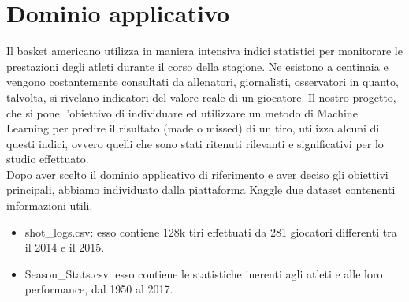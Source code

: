 \section{Dominio applicativo}

Il basket americano utilizza in maniera intensiva indici statistici per monitorare le prestazioni degli atleti durante il corso della stagione. Ne esistono a centinaia e vengono costantemente consultati da allenatori, giornalisti, osservatori in quanto, talvolta, si rivelano indicatori del valore reale di un giocatore.
Il nostro progetto, che si pone l'obiettivo di individuare ed utilizzare un metodo di Machine Learning per predire il risultato (made o missed) di un tiro, utilizza alcuni di questi indici, ovvero quelli che sono stati ritenuti rilevanti e significativi per lo studio effettuato.\\

Dopo aver scelto il dominio applicativo di riferimento e aver deciso gli obiettivi principali, abbiamo individuato dalla piattaforma Kaggle due dataset contenenti informazioni utili.

\begin{itemize}
\item shot\_logs.csv: esso contiene 128k tiri effettuati da 281 giocatori differenti tra il 2014 e il 2015.  
\item Season\_Stats.csv: esso contiene le statistiche inerenti agli atleti e alle loro performance, dal 1950 al 2017.
\end{itemize}
